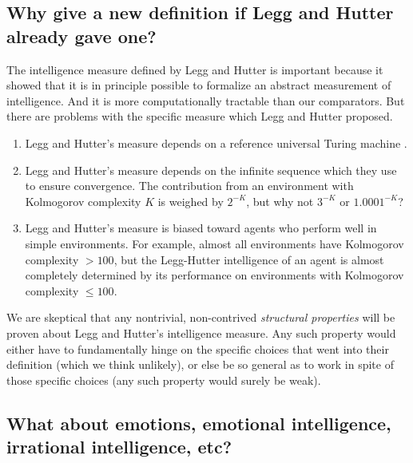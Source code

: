 \documentclass[twoside,11pt]{article}
\begin{document}
\subsection{Why give a new definition if Legg and Hutter already gave one?}

The intelligence measure defined by Legg and Hutter is important because it showed
that it is in principle possible to formalize an abstract measurement of intelligence.
And it is more computationally tractable than our comparators.
But there are problems with the specific measure which Legg and Hutter proposed.
\begin{enumerate}
\item
Legg and Hutter's measure depends on a
reference universal Turing machine \citep{leike2015bad}.
\item
Legg and Hutter's measure depends on the infinite sequence which they use to ensure
convergence. The contribution from an environment with Kolmogorov complexity
$K$ is weighed by $2^{-K}$, but why not $3^{-K}$ or $1.0001^{-K}$?
\item
Legg and Hutter's measure is biased toward agents who perform well in simple environments.
For example, almost all environments have Kolmogorov complexity $>100$,
but the Legg-Hutter intelligence of an agent is almost completely determined by its
performance on environments with Kolmogorov complexity $\leq 100$.
\end{enumerate}
We are skeptical that any nontrivial, non-contrived
\emph{structural properties} will be proven about Legg and Hutter's intelligence measure.
Any such property would either have to fundamentally hinge on the specific
choices that went into their definition (which we think unlikely),
or else be so general as to work in spite of those specific choices
(any such property would surely be weak).

\subsection{What about emotions, emotional intelligence, irrational intelligence, etc?}
\end{document}
